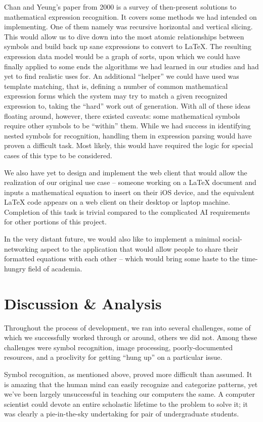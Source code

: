 \documentclass{acm_proc_article-sp}
\begin{document}
Chan and Yeung's paper from 2000 is a survey of then-present solutions to mathematical expression recognition. It covers some methods we had intended on implementing. One of them namely was recursive horizontal and vertical slicing. This would allow us to dive down into the most atomic relationships between symbols and build back up sane expressions to convert to \LaTeX{}. The resulting expression data model would be a graph of sorts, upon which we could have finally applied to some ends the algorithms we had learned in our studies and had yet to find realistic uses for. An additional ``helper'' we could have used was template matching, that is, defining a number of common mathematical expression forms which the system may try to match a given recognized expression to, taking the ``hard'' work out of generation. With all of these ideas floating around, however, there existed caveats: some mathematical symbols require other symbols to be ``within'' them. While we had success in identifying nested symbols for recognition, handling them in expression parsing would have proven a difficult task. Most likely, this would have required the logic for special cases of this type to be considered.

We also have yet to design and implement the web client that would allow the realization of our original use case -- someone working on a \LaTeX{}  document and inputs a mathematical equation to insert on their iOS device, and the equivalent \LaTeX{}  code appears on a web client on their desktop or laptop machine. Completion of this task is trivial compared to the complicated AI requirements for other portions of this project.

In the very distant future, we would also like to implement a minimal social-networking aspect to the application that would allow people to share their formatted equations with each other -- which would bring some haste to the time-hungry field of academia.

\section{Discussion \& Analysis}
Throughout the process of development, we ran into several challenges, some of which we successfully worked through or around, others we did not. Among these challenges were symbol recognition, image processing, poorly-documented resources, and a proclivity for getting ``hung up'' on a particular issue.

Symbol recognition, as mentioned above, proved more difficult than assumed. It is amazing that the human mind can easily recognize and categorize patterns, yet we've been largely unsuccessful in teaching our computers the same. A computer scientist could devote an entire scholastic lifetime to the problem to solve it; it was clearly a pie-in-the-sky undertaking for pair of undergraduate students.
\end{document}
